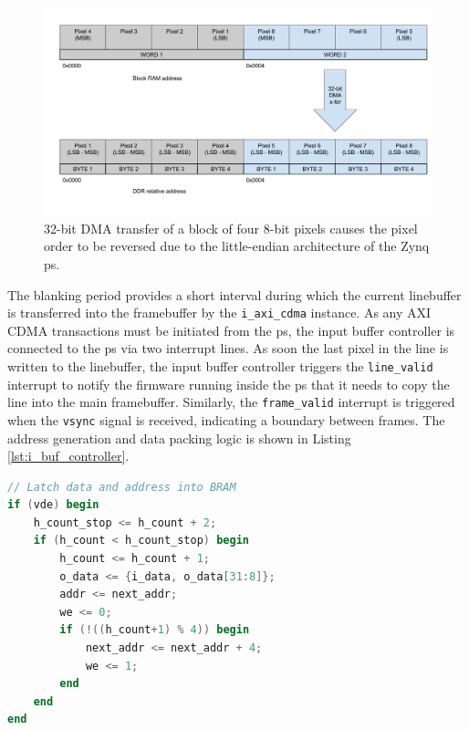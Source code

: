 \begin{figure}
  \centering
  \includegraphics[width=1\textwidth]{./img/dma_endianness.png}
  \caption{32-bit DMA transfer of a block of four 8-bit pixels causes the pixel order to be reversed due to the little-endian architecture of the Zynq \gls{ps}.}
  \label{fig:dma_endianness}
\end{figure}

The blanking period provides a short interval during which the current linebuffer is transferred into the framebuffer by the \texttt{i\_axi\_cdma} instance. As any AXI CDMA transactions must be initiated from the \gls{ps}, the input buffer controller is connected to the \gls{ps} via two interrupt lines. As soon the last pixel in the line is written to the linebuffer, the input buffer controller triggers the \texttt{line\_valid} interrupt to notify the firmware running inside the \gls{ps} that it needs to copy the line into the main framebuffer. Similarly, the \texttt{frame\_valid} interrupt is triggered when the \texttt{vsync} signal is received, indicating a boundary between frames. The address generation and data packing logic is shown in Listing \ref{lst:i_buf_controller}.

\begin{lstlisting}[caption={Address generation and data packing logic for input framebuffer.}, label={lst:i_buf_controller}, language=Verilog]
// Latch data and address into BRAM
if (vde) begin
    h_count_stop <= h_count + 2;
    if (h_count < h_count_stop) begin
        h_count <= h_count + 1;
        o_data <= {i_data, o_data[31:8]};
        addr <= next_addr;
        we <= 0;
        if (!((h_count+1) % 4)) begin
            next_addr <= next_addr + 4;
            we <= 1;
        end
    end
end
\end{lstlisting}


